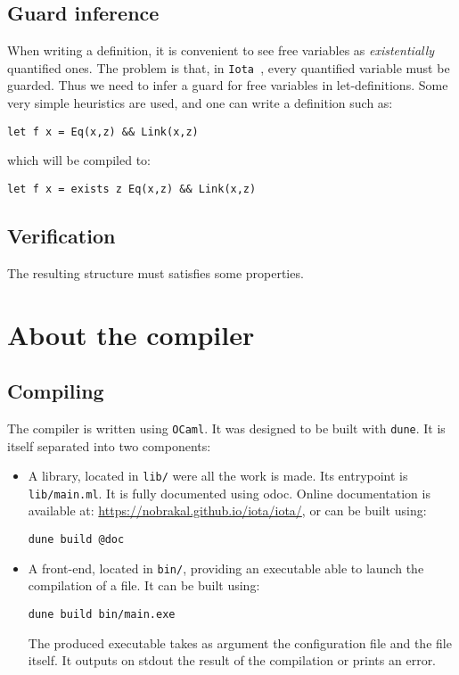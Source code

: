 \documentclass[10pt,a4paper]{article}
\newcommand{\Iota}{\texttt{Iota }}
\begin{document}
\subsection{Guard inference}
\label{subsec:guardinfer}
When writing a definition, it is convenient to see free variables as \emph{existentially} quantified ones. The problem is that, in \Iota, every quantified variable must be guarded. Thus we need to infer a guard for free variables in let-definitions. Some very simple heuristics are used, and one can write a definition such as:
\begin{verbatim}
let f x = Eq(x,z) && Link(x,z)
\end{verbatim}
which will be compiled to:
\begin{verbatim}
let f x = exists z Eq(x,z) && Link(x,z)
\end{verbatim}

\subsection{Verification}
The resulting structure must satisfies some properties.

\section{About the compiler}
\subsection{Compiling}
The compiler is written using \verb|OCaml|. It was designed to be built with \verb|dune|. It is itself separated into two components:

\begin{itemize}
\item A library, located in \verb|lib/| were all the work is made. Its entrypoint is \verb|lib/main.ml|. It is fully documented using odoc\cite{odoc}. Online documentation is available at: \url{https://nobrakal.github.io/iota/iota/}, or can be built using:
\begin{verbatim}
dune build @doc
\end{verbatim}
\item A front-end, located in \verb|bin/|, providing an executable able to launch the compilation of a file. It can be built using:
\begin{verbatim}
dune build bin/main.exe
\end{verbatim}
  The produced executable takes as argument the configuration file and the file itself. It outputs on stdout the result of the compilation or prints an error.
\end{itemize}
\end{document}
